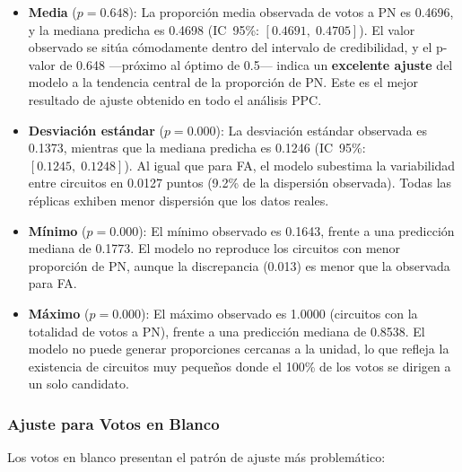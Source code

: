 \begin{itemize}
    \item \textbf{Media} ($p = 0.648$): La proporci\'on media observada de votos a PN es 0.4696, y la mediana predicha es 0.4698 (IC~95\%: $[0.4691,\; 0.4705]$). El valor observado se sit\'ua c\'omodamente dentro del intervalo de credibilidad, y el p-valor de 0.648 ---pr\'oximo al \'optimo de 0.5--- indica un \textbf{excelente ajuste} del modelo a la tendencia central de la proporci\'on de PN. Este es el mejor resultado de ajuste obtenido en todo el an\'alisis PPC.

    \item \textbf{Desviaci\'on est\'andar} ($p = 0.000$): La desviaci\'on est\'andar observada es 0.1373, mientras que la mediana predicha es 0.1246 (IC~95\%: $[0.1245,\; 0.1248]$). Al igual que para FA, el modelo subestima la variabilidad entre circuitos en 0.0127 puntos (9.2\% de la dispersi\'on observada). Todas las r\'eplicas exhiben menor dispersi\'on que los datos reales.

    \item \textbf{M\'inimo} ($p = 0.000$): El m\'inimo observado es 0.1643, frente a una predicci\'on mediana de 0.1773. El modelo no reproduce los circuitos con menor proporci\'on de PN, aunque la discrepancia (0.013) es menor que la observada para FA.

    \item \textbf{M\'aximo} ($p = 0.000$): El m\'aximo observado es 1.0000 (circuitos con la totalidad de votos a PN), frente a una predicci\'on mediana de 0.8538. El modelo no puede generar proporciones cercanas a la unidad, lo que refleja la existencia de circuitos muy peque\~nos donde el 100\% de los votos se dirigen a un solo candidato.
\end{itemize}

\subsubsection{Ajuste para Votos en Blanco}

Los votos en blanco presentan el patr\'on de ajuste m\'as problem\'atico:

